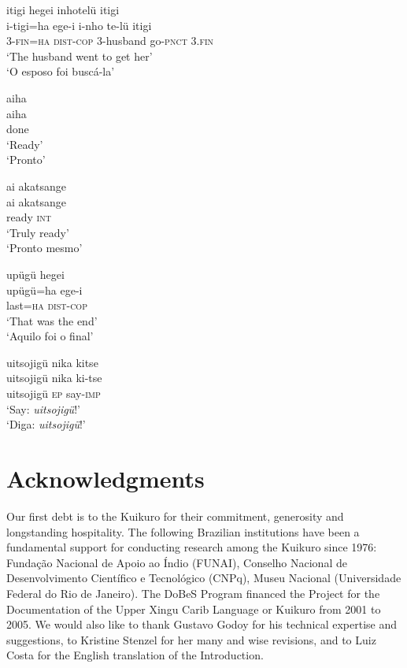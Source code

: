 \documentclass[output=paper,
modfonts,nonflat
]{langsci/langscibook}
\begin{document}
\ea itigi hegei inhotelü itigi \\[.3em]
\gll i-tigi=ha ege-i i-nho te-lü itigi \\
3-\textsc{fin=ha} \textsc{dist-cop} 3-husband go\textsc{-pnct} 3\textsc{.fin} \\
\glt ‘The husband went to get her’ \\
‘O esposo foi buscá-la’ \\
\z

\ea aiha{\footnotemark}{} \\[.3em]
\gll aiha \\
done \\
\glt ‘Ready’ \\
‘Pronto’ \\
\z

\ea ai akatsange \\[.3em]
\gll ai akatsange \\
ready \textsc{int} \\
\glt ‘Truly ready’ \\
‘Pronto mesmo’ \\
\z

\ea upügü hegei \\[.3em]
\gll upügü=ha ege-i \\
last\textsc{=ha} \textsc{dist-cop} \\
\glt ‘That was the end’ \\
‘Aquilo foi o final’ \\
\z

 
\ea uitsojigü nika kitse \\[.3em]
\gll uitsojigü nika ki-tse \\
uitsojigü \textsc{ep} say-\textsc{imp} \\
\glt ‘Say: \emph{uitsojigü}!’ \\
‘Diga: \emph{uitsojigü}!’ \\
\z

\section*{Acknowledgments}
Our first debt is to the Kuikuro for their commitment, generosity and longstanding hospitality. The following Brazilian institutions have been a fundamental support for conducting research among the Kuikuro since 1976: Fundação Nacional de Apoio ao Índio (FUNAI), Conselho Nacional de Desenvolvimento Científico e Tecnológico (CNPq), Museu Nacional (Universidade Federal do Rio de Janeiro). The DoBeS Program financed the Project for the Documentation of the Upper Xingu Carib Language or Kuikuro from 2001 to 2005. We would also like to thank Gustavo Godoy for his technical expertise and suggestions, to Kristine Stenzel for her many and wise revisions, and to Luiz Costa for the English translation of the Introduction.
\end{document}

